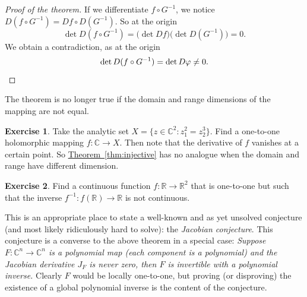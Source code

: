 \documentclass[12pt,openany]{book}
\newcommand{\C}{{\mathbb{C}}}
\newcommand{\R}{{\mathbb{R}}}
\newcommand{\myindex}[1]{#1\index{#1}}
\theoremstyle{plain}
\theoremstyle{remark}
\theoremstyle{definition}
\newenvironment{exbox}{%
    \def\FrameCommand{\vrule width 1pt \relax\hspace {10pt}}%
    \MakeFramed {\advance \hsize -\width \FrameRestore }%
}{%
    \endMakeFramed
}
\theoremstyle{exercise}
\newtheorem{exercise}{Exercise}[section]
\theoremstyle{example}
\newcommand{\thmref}[1]{\hyperref[#1]{Theorem~\ref*{#1}}}
\begin{document}
\begin{proof}[Proof of the theorem]
If we differentiate $f \circ G^{-1}$, we notice 
$D(f \circ G^{-1}) = Df \circ D(G^{-1})$.
So at the origin
\begin{equation*}
\det D(f \circ G^{-1}) = \bigl(\det Df\bigr) \bigl(\det D(G^{-1})\bigr) = 0.
\end{equation*}
We obtain a contradiction, as at the origin
\begin{equation*}
\det 
D(f \circ G^{-1})
= \det D\varphi \not= 0 . \qedhere
\end{equation*}
\end{proof}

The theorem is no longer true if the domain and range dimensions of the
mapping are not equal.

\begin{exbox}
\begin{exercise}
Take the analytic set
$X = \bigl\{ z \in \C^2 : z_1^2 = z_2^3 \bigr\}$.
Find a one-to-one holomorphic mapping $f \colon \C \to X$.
Then note that the derivative of $f$ vanishes at a certain point.
So \thmref{thm:injective} has no analogue when the domain and range have
different dimension.
\end{exercise}

\begin{exercise}
Find a continuous function $f \colon \R \to \R^2$ that is one-to-one but
such that the inverse $f^{-1} \colon f(\R) \to \R$ is not continuous.
\end{exercise}
\end{exbox}

\pagebreak[1]
This is an appropriate place to state a well-known and as yet unsolved conjecture (and most
likely ridiculously hard to solve):
the \emph{\myindex{Jacobian conjecture}}.
This conjecture is a converse to the above
theorem in a special case:
\emph{Suppose $F \colon \C^n \to \C^n$ is a polynomial map (each component is a
polynomial) and the Jacobian derivative $J_F$ is never zero, then $F$ is
invertible with a polynomial inverse.}
Clearly $F$ would be locally one-to-one, but proving (or
disproving)
the existence of a global polynomial inverse is the content of the conjecture.
\end{document}
